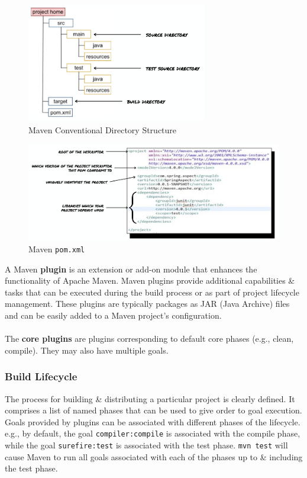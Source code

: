 \documentclass[a4paper,11pt]{article}
\begin{document}
\begin{figure}[H]
    \centering
    \includegraphics[width=0.7\textwidth]{images/mvn_conv_dir_structure.png}
    \caption{Maven Conventional Directory Structure}
\end{figure}

\begin{figure}[H]
    \centering
    \includegraphics[width=\textwidth]{images/mvn_pom.png}
    \caption{Maven \texttt{pom.xml}}
\end{figure}

A Maven \textbf{plugin} is an extension or add-on module that enhances the functionality of Apache Maven.
Maven plugins provide additional capabilities \& tasks that can be executed during the build process or as part of 
project lifecycle management.
These plugins are typically packages as JAR (Java Archive) files and can be easily added to a Maven project's
configuration.
\\\\
The \textbf{core plugins} are plugins corresponding to default core phases (e.g., clean, compile).
They may also have multiple goals.

\subsubsection{Build Lifecycle}
The process for building \& distributing a particular project is clearly defined. 
It comprises a list of named phases that can be used to give order to goal execution.
Goals provided by plugins can be associated with different phases of the lifecycle.
e.g., by default, the goal \verb|compiler:compile| is associated with the compile phase, while the goal
\verb|surefire:test| is associated with the test phase.
\texttt{mvn test} will cause Maven to run all goals associated with each of the phases up to \& including
the test phase.
\end{document}
